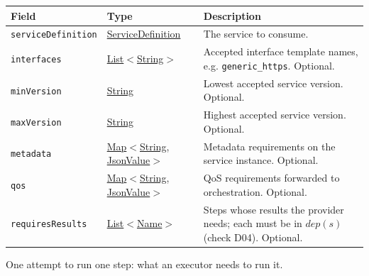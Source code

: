 \documentclass[a4paper]{arrowhead}
\newcommand{\pref}[1]{{\textcolor{ArrowheadGrey}{\hyperref[sec:model:primitives:#1]{#1}}}}
\begin{document}
{\small
\begin{longtable}{|p{3.9cm}|p{4.4cm}|p{7.5cm}|}

\hline
\rowcolor{gray!33} Field & Type & Description \\ \hline
\endhead
\texttt{serviceDefinition} & \pref{ServiceDefinition} & The service to consume. \\ \hline
\texttt{interfaces} & \pref{List}$<$\pref{String}$>$ & Accepted interface template names, e.g. \texttt{generic\_https}. Optional. \\ \hline
\texttt{minVersion} & \pref{String} & Lowest accepted service version. Optional. \\ \hline
\texttt{maxVersion} & \pref{String} & Highest accepted service version. Optional. \\ \hline
\texttt{metadata} & \pref{Map}$<$\pref{String}, \pref{JsonValue}$>$ & Metadata requirements on the service instance. Optional. \\ \hline
\texttt{qos} & \pref{Map}$<$\pref{String}, \pref{JsonValue}$>$ & QoS requirements forwarded to orchestration. Optional. \\ \hline
\texttt{requiresResults} & \pref{List}$<$\pref{Name}$>$ & Steps whose results the provider needs; each must be in $dep(s)$ (check D04). Optional. \\ \hline
\end{longtable}
}

One attempt to run one step: what an executor needs to run it.
\end{document}
